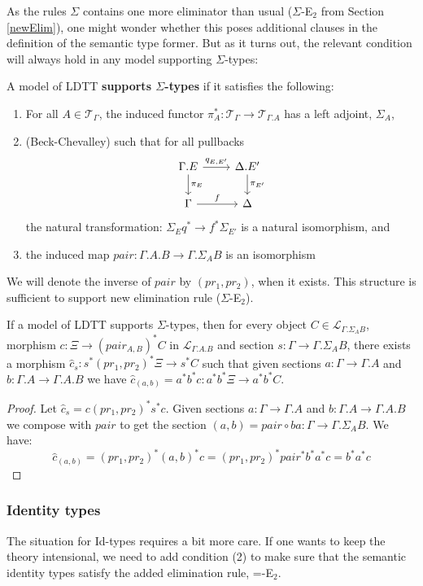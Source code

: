 \documentclass[a4paper,english]{lipics-v2018}
\begin{document}
As the rules $\Sigma$ contains one more eliminator than usual ($\Sigma$-E$_2$ from Section \ref{newElim}), one might wonder whether this poses additional clauses in the definition of the semantic type former. But as it turns out, the relevant condition will always hold in any model supporting $\Sigma$-types:
\begin{definition}A model of LDTT \textbf{supports $\Sigma$-types} if it satisfies the following:
  \begin{enumerate}
  \item For all $A \in \mathcal{T}_{\Gamma}$, the induced functor $\pi_A^* : \mathcal{T}_{\Gamma} \to \mathcal{T}_{\Gamma.A}$ has a left adjoint, $\Sigma_A$,
  \item (Beck-Chevalley) such that for all pullbacks
    \[
    \begin{tikzcd}
     \Gamma.E \ar[d, "\pi_E"] \ar[r, "q_{E, E'}"] & \Delta.E' \ar[d, "\pi_{E'}"] \\
     \Gamma \ar[r, "f"] & \Delta
    \end{tikzcd}
    \] 
    the natural transformation: $\Sigma_Eq^* \to f^*\Sigma_{E'}$ is a natural isomorphism, and
  \item the induced map $pair: \Gamma.A.B \to \Gamma.\Sigma_AB$ is an isomorphism
  \end{enumerate}
\end{definition}
We will denote the inverse of $pair$ by $(pr_1, pr_2)$, when it exists.
This structure is sufficient to support new elimination rule ($\Sigma$-E$_2$).
\begin{theorem}
If a model of LDTT supports $\Sigma$-types, then for every object $C \in \mathcal{L}_{\Gamma.\Sigma_AB}$, morphism $c : \Xi \to (pair_{A,B})^*C$ in $\mathcal{L}_{\Gamma.A.B}$ and section $s : \Gamma \to \Gamma.\Sigma_AB$, there exists a morphism $\hat c_s : s^*(pr_1, pr_2)^*\Xi \to s^*C$ such that given sections $a : \Gamma \to \Gamma.A$ and $b : \Gamma.A \to \Gamma.A.B$ we have $\hat c_{(a, b)} = a^*b^*c : a^*b^*\Xi \to a^*b^*C$.
\begin{proof}
Let $\hat c_s = c(pr_1,pr_2)^*s^*c$. Given sections $a : \Gamma \to \Gamma.A$ and $b : \Gamma.A \to \Gamma.A.B$ we compose with $pair$ to get the section $(a, b) = pair \circ ba : \Gamma \to \Gamma.\Sigma_AB$. We have:
    \[
     \hat c_{(a,b)} = (pr_1,pr_2)^*(a,b)^*c = (pr_1,pr_2)^*pair^*b^*a^*c = b^*a^*c
    \]
  \end{proof}
\end{theorem}
\subsubsection{Identity types}
The situation for Id-types requires a bit more care. If one wants to keep the theory intensional, we need to add condition (2) to make sure that the semantic identity types satisfy the added elimination rule, =-E$_2$.
\end{document}
